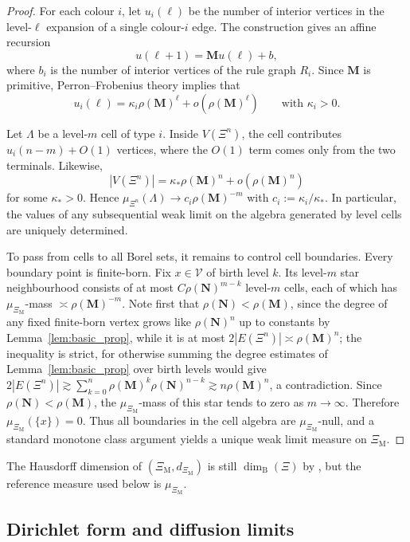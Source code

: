 \documentclass{article}
\theoremstyle{plain}
\theoremstyle{definition}
\newcommand{\dimbox}{\dim_\mathrm{B}}
\begin{document}
\begin{proof}
For each colour $i$, let $u_i(\ell)$ be the number of interior vertices in the level-$\ell$ expansion of a single colour-$i$ edge.
The construction gives an affine recursion
\[
u(\ell+1)=\mathbf M u(\ell)+b,
\]
where $b_i$ is the number of interior vertices of the rule graph $R_i$.
Since $\mathbf M$ is primitive, Perron--Frobenius theory implies that
\[
u_i(\ell)=\kappa_i\rho(\mathbf M)^\ell+o(\rho(\mathbf M)^\ell)
\qquad\text{with }\kappa_i>0.
\]

Let $\Lambda$ be a level-$m$ cell of type $i$.
Inside $V(\Xi^n)$, the cell contributes $u_i(n-m)+O(1)$ vertices, where the $O(1)$ term comes only from the two terminals.
Likewise,
\[
|V(\Xi^n)|=\kappa_*\rho(\mathbf M)^n+o(\rho(\mathbf M)^n)
\]
for some $\kappa_*>0$.
Hence $\mu_{\Xi^n}(\Lambda)\to c_i\rho(\mathbf M)^{-m}$ with $c_i:=\kappa_i/\kappa_*$.
In particular, the values of any subsequential weak limit on the algebra generated by level cells are uniquely determined.

To pass from cells to all Borel sets, it remains to control cell boundaries.
Every boundary point is finite-born.
Fix $x\in \mathscr V$ of birth level $k$.
Its level-$m$ star neighbourhood consists of at most $C\rho(\mathbf N)^{m-k}$ level-$m$ cells, each of which has $\mu_{\Xi_{\mathrm M}}$-mass $\asymp \rho(\mathbf M)^{-m}$.
Note first that $\rho(\mathbf N)<\rho(\mathbf M)$, since the degree of any fixed finite-born vertex grows like $\rho(\mathbf N)^{n}$ up to constants by Lemma~\ref{lem:basic_prop}, while it is at most $2|E(\Xi^n)|\asymp\rho(\mathbf M)^n$; the inequality is strict, for otherwise summing the degree estimates of Lemma~\ref{lem:basic_prop} over birth levels would give $2|E(\Xi^n)|\gtrsim\sum_{k=0}^{n}\rho(\mathbf M)^{k}\rho(\mathbf N)^{n-k}\gtrsim n\rho(\mathbf M)^n$, a contradiction.
Since $\rho(\mathbf N)<\rho(\mathbf M)$, the $\mu_{\Xi_{\mathrm M}}$-mass of this star tends to zero as $m\to\infty$.
Therefore $\mu_{\Xi_{\mathrm M}}(\{x\})=0$.
Thus all boundaries in the cell algebra are $\mu_{\Xi_{\mathrm M}}$-null, and a standard monotone class argument yields a unique weak limit measure on $\Xi_{\mathrm M}$.
\end{proof}

The Hausdorff dimension of $(\Xi_{\mathrm M},d_{\Xi_{\mathrm M}})$ is still $\dimbox(\Xi)$ by \cite{neroli2024fractal}, but the reference measure used below is $\mu_{\Xi_{\mathrm M}}$.

\subsection{Dirichlet form and diffusion limits}\label{subsec:Dirichlet_form}
\end{document}
